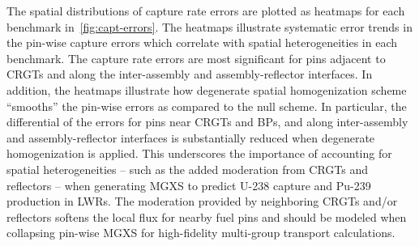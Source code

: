 The spatial distributions of capture rate errors are plotted as heatmaps for each benchmark in~\autoref{fig:capt-errors}. The heatmaps illustrate systematic error trends in the pin-wise capture errors which correlate with spatial heterogeneities in each benchmark. The capture rate errors are most significant for pins adjacent to CRGTs and along the inter-assembly and assembly-reflector interfaces. In addition, the heatmaps illustrate how degenerate spatial homogenization scheme ``smooths'' the pin-wise errors as compared to the null scheme. In particular, the differential of the errors for pins near CRGTs and BPs, and along inter-assembly and assembly-reflector interfaces is substantially reduced when degenerate homogenization is applied. This underscores the importance of accounting for spatial heterogeneities -- such as the added moderation from CRGTs and reflectors -- when generating MGXS to predict U-238 capture and Pu-239 production in LWRs. The moderation provided by neighboring CRGTs and/or reflectors softens the local flux for nearby fuel pins and should be modeled when collapsing pin-wise MGXS for high-fidelity multi-group transport calculations. 

